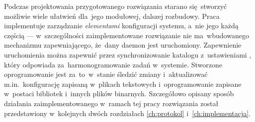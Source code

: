 \documentclass[thesis]{subfiles}
\begin{document}
Podczas projektowania przygotowanego rozwiązania starano się~stworzyć możliwie wiele ułatwień dla~jego modułowej, dalszej rozbudowy. Praca implementuje zarządzanie \emph{elementami} konfiguracji systemu, a~nie jego każdą częścią --- w~szczególności zaimplementowane rozwiązanie nie ma~wbudowanego mechanizmu zapewniającego, że~dany \gls{daemon} jest uruchomiony. Zapewnienie uruchomienia  można zapewnić przez synchronizowanie katalogu z~ustawieniami , który odpowiada za~harmonogramowanie zadań w~systemie. Stworzone oprogramowanie jest za~to~w~stanie śledzić zmiany i~aktualizować m.in.~konfigurację zapisaną w~plikach tekstowych i~oprogramowanie zapisane w~postaci bibliotek i~innych plików binarnych. Szczegółowo opisany sposób działania zaimplementowanego w~ramach tej pracy rozwiązania został przedstawiony w~kolejnych dwóch rozdziałach \ref{ch:protokol} i~\ref{ch:implementacja}.
\end{document}
